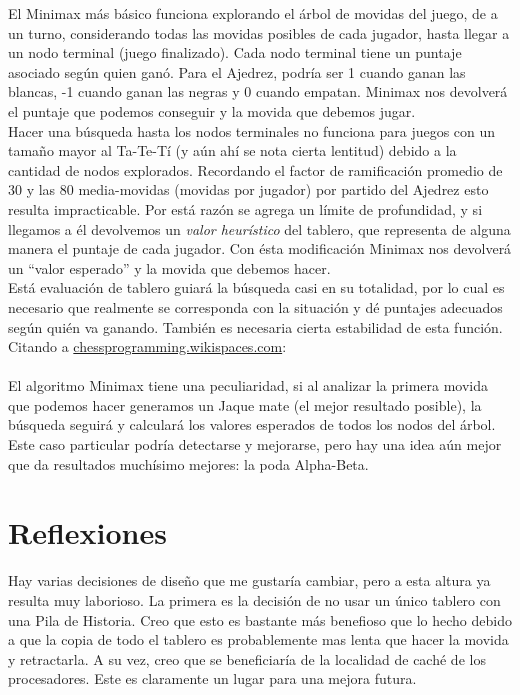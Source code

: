 \documentclass{article}
\begin{document}
El Minimax más básico funciona explorando el árbol de movidas del
juego, de a un turno, considerando todas las movidas posibles de cada
jugador, hasta llegar a un nodo terminal (juego finalizado). Cada nodo
terminal tiene un puntaje asociado según quien ganó. Para el Ajedrez,
podría ser 1 cuando ganan las blancas, -1 cuando ganan las negras y 0
cuando empatan. Minimax nos devolverá el puntaje que podemos conseguir
y la movida que debemos jugar.
\\

Hacer una búsqueda hasta los nodos terminales no funciona para juegos
con un tamaño mayor al Ta-Te-Tí (y aún ahí se nota cierta lentitud)
debido a la cantidad de nodos explorados. Recordando el factor de
ramificación promedio de 30 y las 80 media-movidas (movidas por
jugador) por partido del Ajedrez esto resulta impracticable. Por
está razón se agrega un límite de profundidad, y si llegamos a él
devolvemos un \emph{valor heurístico} del tablero, que representa
de alguna manera el puntaje de cada jugador. Con ésta modificación
Minimax nos devolverá un ``valor esperado'' y la movida que debemos
hacer.
\\

Está evaluación de tablero guiará la búsqueda casi en su
totalidad, por lo cual es necesario que realmente se corresponda con
la situación y dé puntajes adecuados según quién va ganando.
También es necesaria cierta estabilidad de esta función. Citando a
\href{http://chessprogramming.wikispaces.com/}{chessprogramming.wikispaces.com}:
\\

\noindent
{}
\\

El algoritmo Minimax tiene una peculiaridad, si al analizar la primera
movida que podemos hacer generamos un Jaque mate (el mejor resultado
posible), la búsqueda seguirá y calculará los valores esperados de
todos los nodos del árbol. Este caso particular podría detectarse y
mejorarse, pero hay una idea aún mejor que da resultados muchísimo
mejores: la poda Alpha-Beta.

\section{Reflexiones}
Hay varias decisiones de diseño que me gustaría cambiar, pero a esta
altura ya resulta muy laborioso. La primera es la decisión de no usar
un único tablero con una Pila de Historia. Creo que esto es bastante
más benefioso que lo hecho debido a que la copia de todo el tablero es
probablemente mas lenta que hacer la movida y retractarla. A su vez,
creo que se beneficiaría de la localidad de caché de los procesadores.
Este es claramente un lugar para una mejora futura.
\\
\end{document}
